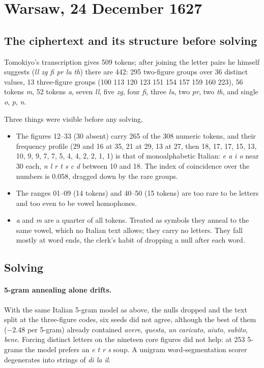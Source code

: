\documentclass[11pt]{article}
\begin{document}
\section{Warsaw, 24 December 1627}

\subsection{The ciphertext and its structure before solving}

Tomokiyo's transcription gives 509 tokens; after joining the letter pairs he himself suggests (\emph{ll zg fi pr lu th}) there are 442: 295 two-figure groups over 36 distinct values, 13 three-figure groups (100 113 120 123 151 154 157 159 160 223), 56 tokens \emph{m}, 52 tokens \emph{a}, seven \emph{ll}, five \emph{zg}, four \emph{fi}, three \emph{lu}, two \emph{pr}, two \emph{th}, and single \emph{o}, \emph{p}, \emph{n}.

Three things were visible before any solving.

\begin{itemize}\itemsep0pt
\item The figures 12--33 (30 absent) carry 265 of the 308 numeric tokens, and their frequency profile (29 and 16 at 35, 21 at 29, 13 at 27, then 18, 17, 17, 15, 13, 10, 9, 9, 7, 7, 5, 4, 4, 2, 2, 1, 1) is that of monoalphabetic Italian: \emph{e a i o} near 30 each, \emph{n l r t s c d} between 10 and 18. The index of coincidence over the numbers is 0.058, dragged down by the rare groups.
\item The ranges 01--09 (14 tokens) and 40--50 (15 tokens) are too rare to be letters and too even to be vowel homophones.
\item \emph{a} and \emph{m} are a quarter of all tokens. Treated as symbols they anneal to the same vowel, which no Italian text allows; they carry no letters. They fall mostly at word ends, the clerk's habit of dropping a null after each word.
\end{itemize}

\subsection{Solving}

\paragraph{5-gram annealing alone drifts.} With the same Italian 5-gram model as above, the nulls dropped and the text split at the three-figure codes, six seeds did not agree, although the best of them ($-2.48$ per 5-gram) already contained \emph{avere}, \emph{questa}, \emph{un caricato}, \emph{aiuto}, \emph{subito}, \emph{bene}. Forcing distinct letters on the nineteen core figures did not help: at 253 5-grams the model prefers an \emph{e t r s} soup. A unigram word-segmentation scorer degenerates into strings of \emph{di la il}.
\end{document}
